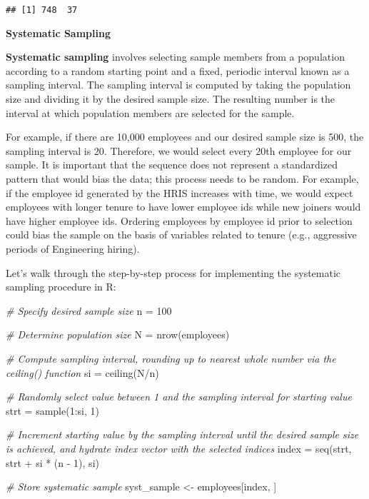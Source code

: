 \documentclass[
]{book}
\newenvironment{Shaded}{\begin{snugshade}}{\end{snugshade}}
\newcommand{\CommentTok}[1]{\textcolor[rgb]{0.56,0.35,0.01}{\textit{#1}}}
\newcommand{\DecValTok}[1]{\textcolor[rgb]{0.00,0.00,0.81}{#1}}
\newcommand{\FunctionTok}[1]{\textcolor[rgb]{0.00,0.00,0.00}{#1}}
\newcommand{\NormalTok}[1]{#1}
\newcommand{\OtherTok}[1]{\textcolor[rgb]{0.56,0.35,0.01}{#1}}
\newcommand{\SpecialCharTok}[1]{\textcolor[rgb]{0.00,0.00,0.00}{#1}}
\begin{document}
\begin{verbatim}
## [1] 748  37
\end{verbatim}

\textbf{Systematic Sampling}

\textbf{Systematic sampling} involves selecting sample members from a population according to a random starting point and a fixed, periodic interval known as a sampling interval. The sampling interval is computed by taking the population size and dividing it by the desired sample size. The resulting number is the interval at which population members are selected for the sample.

For example, if there are 10,000 employees and our desired sample size is 500, the sampling interval is 20. Therefore, we would select every 20th employee for our sample. It is important that the sequence does not represent a standardized pattern that would bias the data; this process needs to be random. For example, if the employee id generated by the HRIS increases with time, we would expect employees with longer tenure to have lower employee ids while new joiners would have higher employee ids. Ordering employees by employee id prior to selection could bias the sample on the basis of variables related to tenure (e.g., aggressive periods of Engineering hiring).

Let's walk through the step-by-step process for implementing the systematic sampling procedure in R:

\begin{Shaded}
\begin{Highlighting}[]
\CommentTok{\# Specify desired sample size}
\NormalTok{n }\OtherTok{=} \DecValTok{100}

\CommentTok{\# Determine population size}
\NormalTok{N }\OtherTok{=} \FunctionTok{nrow}\NormalTok{(employees)}

\CommentTok{\# Compute sampling interval, rounding up to nearest whole number via the ceiling() function}
\NormalTok{si }\OtherTok{=} \FunctionTok{ceiling}\NormalTok{(N}\SpecialCharTok{/}\NormalTok{n)}

\CommentTok{\# Randomly select value between 1 and the sampling interval for starting value}
\NormalTok{strt }\OtherTok{=} \FunctionTok{sample}\NormalTok{(}\DecValTok{1}\SpecialCharTok{:}\NormalTok{si, }\DecValTok{1}\NormalTok{)}

\CommentTok{\# Increment starting value by the sampling interval until the desired sample size is achieved, and hydrate index vector with the selected indices}
\NormalTok{index }\OtherTok{=} \FunctionTok{seq}\NormalTok{(strt, strt }\SpecialCharTok{+}\NormalTok{ si }\SpecialCharTok{*}\NormalTok{ (n }\SpecialCharTok{{-}} \DecValTok{1}\NormalTok{), si)}

\CommentTok{\# Store systematic sample}
\NormalTok{syst\_sample }\OtherTok{\textless{}{-}}\NormalTok{ employees[index, ]}
\end{Highlighting}
\end{Shaded}
\end{document}
